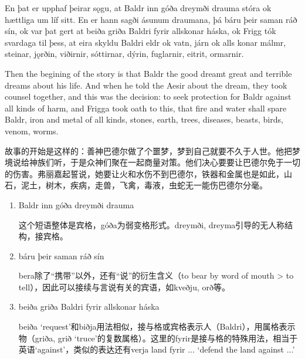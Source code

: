 \begin{paracol}{2}
    En þat er upphaf þeirar sǫgu, at Baldr inn góða dreymði drauma stóra ok hættliga um líf sitt. En er hann sagði ásunum draumana, þá báru þeir saman ráð sín, ok var þat gert at beiða griða Baldri fyrir allskonar háska, ok Frigg tók svardaga til þess, at eira skyldu Baldri eldr ok vatn, járn ok alls konar málmr, steinar, jǫrðin, viðirnir, sóttirnar, dýrin, fuglarnir, eitrit, ormarnir.

    \switchcolumn

    Then the begining of the story is that Baldr the good dreamt great and terrible dreams about his life. And when he told the Aesir about the dream, they took counsel together, and this was the decision: to seek protection for Baldr against all kinds of harm, and Frigga took oath to this, that fire and water shall spare Baldr, iron and metal of all kinds, stones, earth, trees, diseases, beasts, birds, venom, worms.
\end{paracol}
\begin{translation*}{}
    故事的开始是这样的：善神巴德尔做了个噩梦，梦到自己就要不久于人世。他把梦境说给神族们听，于是众神们聚在一起商量对策。他们决心要要让巴德尔免于一切的伤害。弗丽嘉起誓说，她要让火和水伤不到巴德尔，铁器和金属也是如此，山石，泥土，树木，疾病，走兽，飞禽，毒液，虫蛇无一能伤巴德尔分毫。
\end{translation*}
\begin{grammar*}{}
    \begin{enumerate}[leftmargin=*]
        \item Baldr inn góða dreymði drauma

              这个短语整体是宾格，góða为弱变格形式。dreymði, dreyma引导的无人称结构，接宾格。

        \item báru þeir saman ráð sín

              bera除了“携带”以外，还有“说”的衍生含义（to bear by word of mouth > to tell），因此可以接续与言说有关的宾语，如kveðju, orð等。

        \item beiða griða Baldri fyrir allskonar háska

              beiða `request'和biðja用法相似，接与格或宾格表示人（Baldri），用属格表示物（griða, grið `truce'的复数属格）。这里的fyrir是接与格的特殊用法，相当于英语`against'，类似的表达还有verja land fyrir ... `defend the land against ...'
    \end{enumerate}
\end{grammar*}

